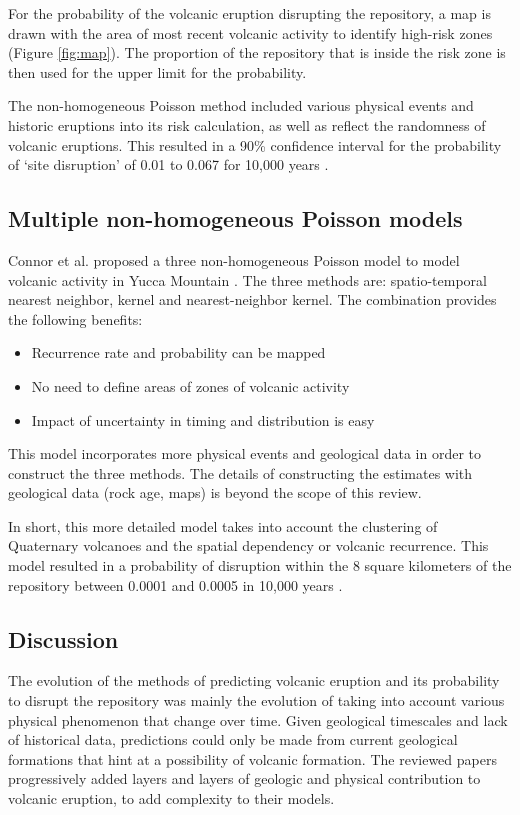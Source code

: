 \documentclass[12pt]{article}
\begin{document}
For the probability of the volcanic eruption disrupting the repository, a map is drawn
with the area of most recent volcanic activity to identify high-risk zones (Figure \ref{fig:map}).
The proportion of the repository that is inside the risk zone is then used
for the upper limit for the probability.


The non-homogeneous Poisson method included various physical events and historic eruptions
into its risk calculation, as well as reflect the randomness of volcanic eruptions.
This resulted in a 90\% confidence interval for the probability of `site disruption'
of 0.01 to 0.067 for 10,000 years \cite{ho_risk_1992}.

\subsection{Multiple non-homogeneous Poisson models}
Connor et al. proposed a three non-homogeneous Poisson model
to model volcanic activity in Yucca Mountain \cite{connor_three_1995}.
The three methods are: spatio-temporal nearest neighbor,
kernel and nearest-neighbor kernel. The combination provides
the following benefits:
\begin{itemize}
    \item Recurrence rate and probability can be mapped \\
    \item No need to define areas of zones of volcanic activity \\
    \item Impact of uncertainty in timing and distribution is easy \\
\end{itemize}

This model incorporates more physical events and geological data 
in order to construct the three methods. The details of constructing 
the estimates with geological data (rock age, maps) is beyond the scope
of this review.

In short, this more detailed model takes into account the 
clustering of Quaternary volcanoes and the spatial dependency
or volcanic recurrence. This model resulted in a probability
of disruption within the 8 square kilometers of the repository
between 0.0001 and 0.0005 in 10,000 years \cite{connor_three_1995}.


\subsection{Discussion}
The evolution of the methods of predicting volcanic eruption
and its probability to disrupt the repository was mainly
the evolution of taking into account various physical phenomenon
that change over time. Given geological timescales and lack
of historical data, predictions could only be made from current
geological formations that hint at a possibility of volcanic formation.
The reviewed papers progressively added layers and layers of geologic
and physical contribution to volcanic eruption, to add complexity to
their models.
\end{document}
